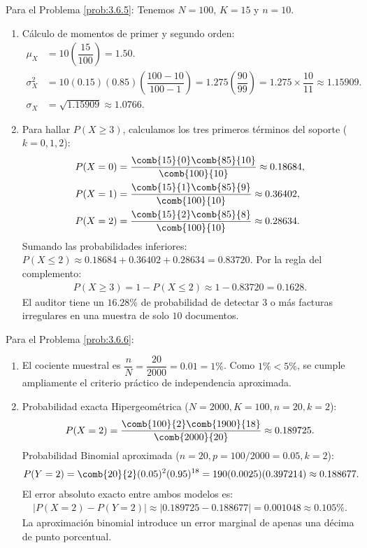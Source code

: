 \begin{solucion}
	\label{sol:3.6.5}
	Para el Problema \ref{prob:3.6.5}:
	Tenemos $N=100$, $K=15$ y $n=10$.
	\begin{enumerate}
		\item Cálculo de momentos de primer y segundo orden:
		\begin{align*}
			\mu_X &= 10 \left(\dfrac{15}{100}\right) = 1.50. \\
			\sigma_X^2 &= 10(0.15)(0.85)\left(\dfrac{100-10}{100-1}\right) = 1.275 \left(\dfrac{90}{99}\right) = 1.275 \times \dfrac{10}{11} \approx 1.15909. \\
			\sigma_X &= \sqrt{1.15909} \approx 1.0766.
		\end{align*}
		\item Para hallar $P(X \ge 3)$, calculamos los tres primeros términos del soporte ($k=0, 1, 2$):
		\begin{align*}
			P(X=0) &= \dfrac{\comb{15}{0}\comb{85}{10}}{\comb{100}{10}} \approx 0.18684, \\
			P(X=1) &= \dfrac{\comb{15}{1}\comb{85}{9}}{\comb{100}{10}} \approx 0.36402, \\
			P(X=2) &= \dfrac{\comb{15}{2}\comb{85}{8}}{\comb{100}{10}} \approx 0.28634.
		\end{align*}
		Sumando las probabilidades inferiores: $P(X \le 2) \approx 0.18684 + 0.36402 + 0.28634 = 0.83720$.
		Por la regla del complemento:
		\begin{align*}
			P(X \ge 3) = 1 - P(X \le 2) \approx 1 - 0.83720 = 0.1628.
		\end{align*}
		El auditor tiene un $16.28\%$ de probabilidad de detectar $3$ o más facturas irregulares en una muestra de solo $10$ documentos.
	\end{enumerate}
\end{solucion}

\begin{solucion}
	\label{sol:3.6.6}
	Para el Problema \ref{prob:3.6.6}:
	\begin{enumerate}
		\item El cociente muestral es $\dfrac{n}{N} = \dfrac{20}{2000} = 0.01 = 1\%$. Como $1\% < 5\%$, se cumple ampliamente el criterio práctico de independencia aproximada.
		\item Probabilidad exacta Hipergeométrica ($N=2000, K=100, n=20, k=2$):
		\begin{align*}
			P(X=2) = \dfrac{\comb{100}{2}\comb{1900}{18}}{\comb{2000}{20}} \approx 0.189725.
		\end{align*}
		Probabilidad Binomial aproximada ($n=20, p=100/2000=0.05, k=2$):
		\begin{align*}
			P(Y=2) = \comb{20}{2}(0.05)^2(0.95)^{18} = 190(0.0025)(0.397214) \approx 0.188677.
		\end{align*}
		El error absoluto exacto entre ambos modelos es:
		\begin{align*}
			|P(X=2) - P(Y=2)| \approx |0.189725 - 0.188677| = 0.001048 \approx 0.105\%.
		\end{align*}
		La aproximación binomial introduce un error marginal de apenas una décima de punto porcentual.
	\end{enumerate}
\end{solucion}

